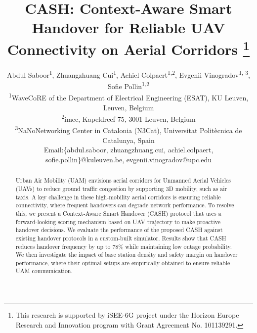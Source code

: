 \documentclass[conference]{IEEEtran}
\newcommand*\zc[1]{\textcolor{blue}{Zach: #1}}
\begin{document}
\title{ CASH: Context-Aware Smart Handover for Reliable UAV Connectivity on Aerial Corridors
\thanks{This research is supported by iSEE-6G project under the Horizon Europe Research and Innovation program with Grant Agreement No. 101139291.
}
}

\author{Abdul Saboor\textsuperscript{1},
         Zhuangzhuang Cui\textsuperscript{1},
         Achiel Colpaert\textsuperscript{1,2},
        Evgenii Vinogradov\textsuperscript{1, 3},
        Sofie Pollin\textsuperscript{1,2}
\\\textsuperscript{1}WaveCoRE of the Department of Electrical Engineering (ESAT), KU Leuven, Leuven, Belgium
\\\textsuperscript{2}imec, Kapeldreef 75, 3001 Leuven, Belgium
\\\textsuperscript{3}NaNoNetworking Center in Catalonia (N3Cat), Universitat Polit\`{e}cnica de Catalunya, Spain
\\Email:\{abdul.saboor, zhuangzhuang.cui,  achiel.colpaert, sofie.pollin\}@kuleuven.be, evgenii.vinogradov@upc.edu}

\maketitle

\begin{abstract}
Urban Air Mobility (UAM) envisions aerial corridors for Unmanned Aerial Vehicles (UAVs) to reduce ground traffic congestion by supporting 3D mobility, such as air taxis. A key challenge in these high-mobility aerial corridors is ensuring reliable connectivity, where frequent handovers can degrade network performance. To resolve this, we present a Context-Aware Smart Handover (CASH) protocol that uses a forward-looking scoring mechanism based on UAV trajectory to make proactive handover decisions. We evaluate the performance of the proposed CASH against existing handover protocols in a custom-built simulator. Results show that CASH reduces handover frequency by up to 78\% while maintaining low outage probability. We then investigate the impact of base station density and safety margin on handover performance, where their optimal setups are empirically obtained to ensure reliable UAM communication.

\end{abstract}
\end{document}
